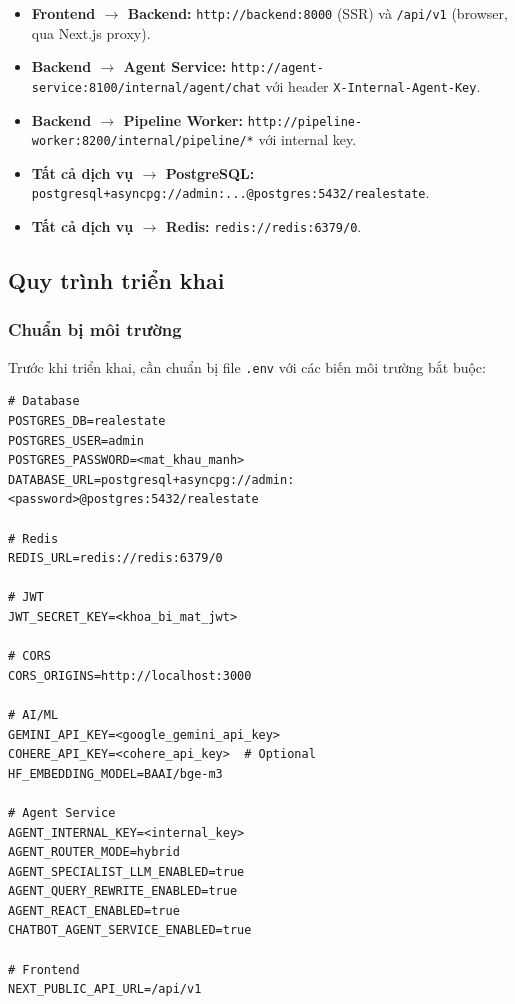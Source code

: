 \begin{itemize}
    \item \textbf{Frontend $\rightarrow$ Backend:} \texttt{http://backend:8000} (SSR) và \texttt{/api/v1} (browser, qua Next.js proxy).
    \item \textbf{Backend $\rightarrow$ Agent Service:} \texttt{http://agent-service:8100/internal/agent/chat} với header \texttt{X-Internal-Agent-Key}.
    \item \textbf{Backend $\rightarrow$ Pipeline Worker:} \texttt{http://pipeline-worker:8200/internal/pipeline/*} với internal key.
    \item \textbf{Tất cả dịch vụ $\rightarrow$ PostgreSQL:} \texttt{postgresql+asyncpg://admin:...@postgres:5432/realestate}.
    \item \textbf{Tất cả dịch vụ $\rightarrow$ Redis:} \texttt{redis://redis:6379/0}.
\end{itemize}

\subsection{Quy trình triển khai}

\subsubsection{Chuẩn bị môi trường}

Trước khi triển khai, cần chuẩn bị file \texttt{.env} với các biến môi trường bắt buộc:

\begin{verbatim}
# Database
POSTGRES_DB=realestate
POSTGRES_USER=admin
POSTGRES_PASSWORD=<mat_khau_manh>
DATABASE_URL=postgresql+asyncpg://admin:<password>@postgres:5432/realestate

# Redis
REDIS_URL=redis://redis:6379/0

# JWT
JWT_SECRET_KEY=<khoa_bi_mat_jwt>

# CORS
CORS_ORIGINS=http://localhost:3000

# AI/ML
GEMINI_API_KEY=<google_gemini_api_key>
COHERE_API_KEY=<cohere_api_key>  # Optional
HF_EMBEDDING_MODEL=BAAI/bge-m3

# Agent Service
AGENT_INTERNAL_KEY=<internal_key>
AGENT_ROUTER_MODE=hybrid
AGENT_SPECIALIST_LLM_ENABLED=true
AGENT_QUERY_REWRITE_ENABLED=true
AGENT_REACT_ENABLED=true
CHATBOT_AGENT_SERVICE_ENABLED=true

# Frontend
NEXT_PUBLIC_API_URL=/api/v1
\end{verbatim}

